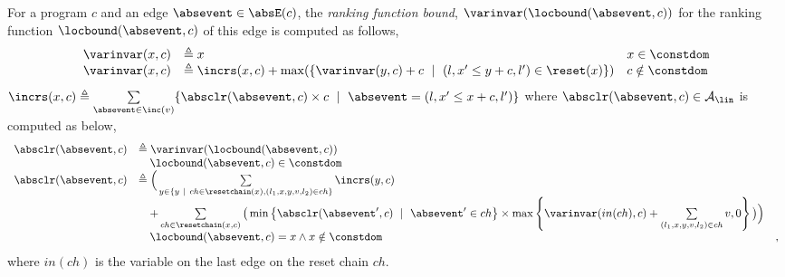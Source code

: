   \begin{defn}
    \label{def:ranking_bound}
  For a program $c$ and an edge $\absevent \in \absE(c)$,
  the \emph{ranking function bound}, $\varinvar(\locbound(\absevent, c))$ for the ranking function $\locbound(\absevent, c)$
  of this edge
  is computed as follows,
    \[ 
  \begin{array}{lll}
    \varinvar(x, c) & \triangleq x & x \in \constdom \\
    \varinvar(x, c) & \triangleq \incrs(x, c) + \max(\{\varinvar(y, c) + c ~\mid~ (l, x' \leq y + c, l') \in \reset(x)\}) & c \notin \constdom
  \end{array}
  \]
  $\incrs(x, c) \triangleq \sum\limits_{\absevent \in \inc(v)}\{\absclr(\absevent, c) \times c ~\mid~ \absevent = (l, x' \leq x + c, l')\}$ where 
  $\absclr(\absevent, c) \in \mathcal{A}_{\lin}$  is computed as below,
\[ 
\begin{array}{lll}
  \absclr(\absevent, c) 
  & \triangleq \varinvar(\locbound(\absevent, c))  & \\
  & \quad \locbound(\absevent, c) \in \constdom & \\
  \absclr(\absevent, c) 
  & \triangleq \Big(
    \sum\limits_{y \in \{ y ~|~ 
    ch \in \resetchain(x), (l_1, x, y, v, l_2) \in ch \} } \incrs(y, c) & \\
    & \quad + 
  \sum\limits_{ch \in \resetchain(x, c)}
  \big( \min\left\{\absclr(\absevent', c) ~\mid~ \absevent' \in ch\right\} \times 
  \max\left\{\varinvar(in(ch), c) + \sum\limits_{(l_1, x, y, v, l_2) \in ch } v, 0 \right\}\big) \Big)  & \\
  &  \quad \locbound(\absevent, c) = x \land x \notin \constdom & ,
\end{array}
  \]
 where $in(ch)$ is the variable on the last edge on the reset chain $ch$.
\end{defn}
